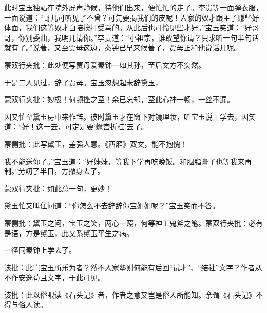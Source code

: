 \begin{parag}
    此时宝玉独站在院外屏声静候，待他们出来，便忙忙的走了。李贵等一面弹衣服，一面说道：“哥儿可听见了不曾？可先要揭我们的皮呢！人家的奴才跟主子赚些好体面，我们这等奴才白陪挨打受骂的。从此后也可怜见些才好。”宝玉笑道：“好哥哥，你别委曲，我明儿请你。”李贵道：“小祖宗，谁敢望你请？只求听一句半句话就有了。”说著，又至贾母这边，秦钟已早来候著了，贾母正和他说话儿呢。\begin{note}蒙双行夹批：此处便写贾母爱秦钟一如其孙，至后文方不突然。\end{note}于是二人见过，辞了贾母。宝玉忽想起未辞黛玉，\begin{note}蒙双行夹批：妙极！何顿挫之至！余已忘却，至此心神一畅，一丝不漏。\end{note}因又忙至黛玉房中来作辞。彼时黛玉才在窗下对镜理妆，听宝玉说上学去，因笑道：“好！这一去，可定是要‘蟾宫折桂’去了。\begin{note}蒙侧批：此写黛玉，差强人意。《西厢》双文，能不抱愧！\end{note}我不能送你了。”宝玉道：“好妹妹，等我下学再吃晚饭。和胭脂膏子也等我来再制。”劳叨了半日，方撤身去了。\begin{note}蒙双行夹批：如此总一句，更妙！\end{note}黛玉忙又叫住问道：“你怎么不去辞辞你宝姐姐呢？”宝玉笑而不答。\begin{note}蒙侧批：黛玉之问，宝玉之笑，两心一照，何等神工鬼斧之笔。蒙双行夹批：必有是语，方是黛玉，此又系黛玉平生之病。\end{note}一径同秦钟上学去了。\begin{note}该批：此岂宝玉所乐为者？然不入家塾则何能有后回“试才”、“结社”文字？作者从不作安逸苟且文字，于此可见。\end{note}\begin{note}该批：此以俗眼读《石头记》者，作者之意又岂是俗人所能知。余谓《石头记》不得与俗人读。\end{note}
\end{parag}

